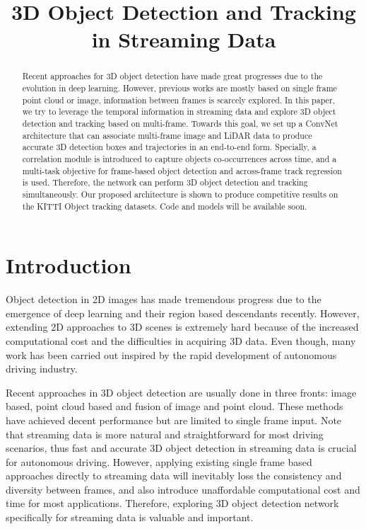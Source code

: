 \documentclass{bmvc2k}
\title{3D Object Detection and Tracking in Streaming Data}
\begin{document}
\maketitle
\begin{abstract}
Recent approaches for 3D object detection have made great progresses due to the evolution in deep learning. However, previous works are mostly based on single frame point cloud or image, information between frames is scarcely explored. In this paper, we try to leverage the temporal information in streaming data and explore 3D object detection and tracking based on multi-frame. Towards this goal, we set up a ConvNet architecture that can associate multi-frame image and LiDAR data to produce accurate 3D detection boxes and trajectories in an end-to-end form. Specially, a correlation module is introduced to capture objects co-occurrences across time, and a multi-task objective for frame-based object detection and across-frame track regression is used. Therefore, the network can perform 3D object detection and tracking simultaneously. Our proposed architecture is shown to produce competitive results on the KITTI Object tracking datasets. Code and models will be available soon.
\end{abstract}

\section{Introduction}
\label{sec:intro} 
Object detection in 2D images has made tremendous progress due to the emergence of deep learning \cite{krizhevsky2012imagenet, simonyan2014very, he2016deep} and their region based descendants \cite{dai2016r, girshick2015fast, ren2015faster} recently. However, extending 2D approaches to 3D scenes is extremely hard because of the increased computational cost and the difficulties in acquiring 3D data. Even though, many work has been carried out inspired by the rapid development of autonomous driving industry. 

Recent approaches in 3D object detection are usually done in three fronts: image based, point cloud based and fusion of image and point cloud. These methods have achieved decent performance but are limited to single frame input. Note that streaming data is more natural and straightforward for most driving scenarios, thus fast and accurate 3D object detection in streaming data is crucial for autonomous driving. However, applying existing single frame based approaches directly to streaming data will inevitably loss the consistency and diversity between frames, and also introduce unaffordable computational cost and time for most applications. Therefore, exploring 3D object detection network specifically for streaming data is valuable and important.
\end{document}
